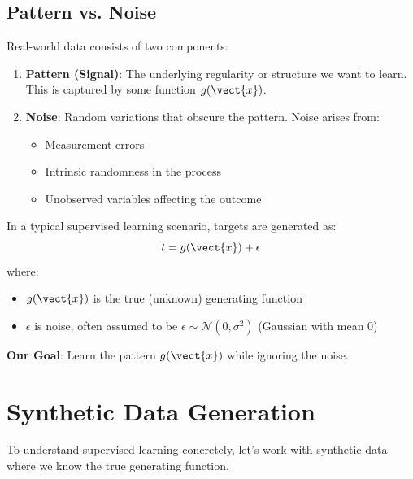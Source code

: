 \subsection{Pattern vs. Noise}

Real-world data consists of two components:

\begin{enumerate}
    \item \textbf{Pattern (Signal)}: The underlying regularity or structure we want to learn. This is captured by some function $g(\vect{x})$.
    
    \item \textbf{Noise}: Random variations that obscure the pattern. Noise arises from:
    \begin{itemize}
        \item Measurement errors
        \item Intrinsic randomness in the process
        \item Unobserved variables affecting the outcome
    \end{itemize}
\end{enumerate}

\begin{definitionbox}
In a typical supervised learning scenario, targets are generated as:
\[
t = g(\vect{x}) + \epsilon
\]
where:
\begin{itemize}
    \item $g(\vect{x})$ is the true (unknown) generating function
    \item $\epsilon$ is noise, often assumed to be $\epsilon \sim \mathcal{N}(0, \sigma^2)$ (Gaussian with mean 0)
\end{itemize}
\end{definitionbox}

\textbf{Our Goal}: Learn the pattern $g(\vect{x})$ while ignoring the noise.


\section{Synthetic Data Generation}

To understand supervised learning concretely, let's work with synthetic data where we know the true generating function.

